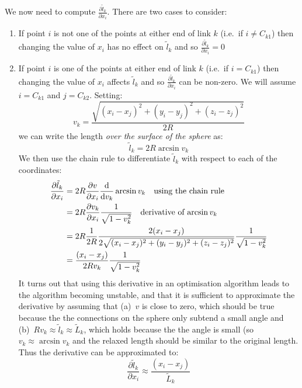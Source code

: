 \documentclass{article}
\newcommand{\dif}{\textup{d}}
\begin{document}
We now need to compute $\frac{\partial \tilde l_k}{\partial x_i}$.
There are two cases to consider:
\begin{enumerate}
\item If point $i$ is not one of the points at either end of link $k$
  (i.e.~if $i \ne C_{k1}$) then changing the value
  of $x_i$ has no effect on $\tilde l_k$ and so
  $\frac{\partial \tilde l_k}{\partial x_i}=0$
\item If point $i$ is one of the points at either end of link $k$
  (i.e.~if $i = C_{k1}$) then changing the value of $x_i$ affects
  $\tilde l_k$ and so $\frac{\partial \tilde l_k}{\partial x_i}$ can
  be non-zero. We will assume $i=C_{k1}$ and $j=C_{k2}$. Setting:
\begin{equation}
  \label{retistruct-algorithm:eq:2}
  v_k = \frac{\sqrt{(x_i-x_j)^2 + (y_i-y_j)^2 + (z_i-z_j)^2}}{2R}
\end{equation}
we can write the length \emph{over the surface of the sphere} as:
\begin{equation}
  \label{retistruct-algorithm:eq:8}
  \tilde l_k = 2R\arcsin v_k
\end{equation}
We then use the chain rule to differentiate $ \tilde l_k$ with respect
to each of the coordinates:
\begin{equation}
  \begin{split}
    \label{retistruct-algorithm:eq:4}
    \frac{\partial \tilde l_k}{\partial x_i} & = 2R \frac{\partial
      v}{\partial x_i}\frac{\dif}{\dif v_k}\arcsin v_k
    \quad \mbox{using the chain rule} \\
    & = 2R \frac{\partial
      v_k}{\partial x_i}\frac{1}{\sqrt{1-v_k^2}} \quad \mbox{derivative of
      $\arcsin v_k$} \\
    & = 2R \frac{1}{2R}\frac{2(x_i-x_j)}{2\sqrt{(x_i-x_j)^2 +
        (y_i-y_j)^2 + (z_i-z_j)^2}}\frac{1}{\sqrt{1-v_k^2}} \\
    & = \frac{(x_i-x_j)}{2Rv_k}\frac{1}{\sqrt{1-v_k^2}}
  \end{split}
\end{equation}
It turns out that using this derivative in an optimisation algorithm
leads to the algorithm becoming unstable, and that it is sufficient to
approximate the derivative by assuming that (a)~$v$ is close to zero,
which should be true because the the connections on the sphere only
subtend a small angle and (b)~$Rv_k\approx \tilde l_k \approx \tilde
L_k$, which holds because the the angle is small (so $v_k\approx
\arcsin v_k$ and the relaxed length should be similar to the original
length. Thus the derivative can be approximated to:
\begin{equation}
  \label{retistruct-algorithm:eq:10}
  \frac{\partial \tilde l_k}{\partial x_i} \approx
  \frac{(x_i-x_j)}{\tilde L_k}
\end{equation}
\end{enumerate}
\end{document}
